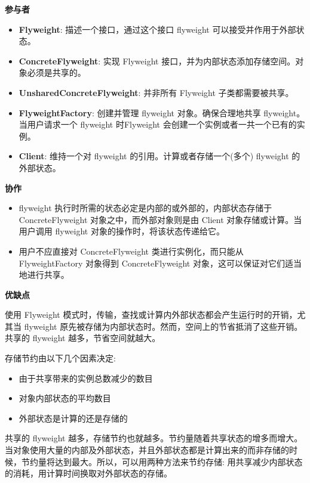 \noindent\textbf{参与者}

\begin{itemize}
    \item \textbf{Flyweight}: 描述一个接口，通过这个接口 flyweight 可以接受并作用于外部状态。
    \item \textbf{ConcreteFlyweight}: 实现 Flyweight 接口，并为内部状态添加存储空间。对象必须是共享的。
    \item \textbf{UnsharedConcreteFlyweight}: 并非所有 Flyweight 子类都需要被共享。
    \item \textbf{FlyweightFactory}: 创建并管理 flyweight 对象。确保合理地共享 flyweight。当用户请求一个 flyweight 时Flyweight 会创建一个实例或者一共一个已有的实例。
    \item \textbf{Client}: 维持一个对 flyweight 的引用。计算或者存储一个(多个) flyweight 的外部状态。
\end{itemize}

\noindent\textbf{协作}

\begin{itemize}
    \item flyweight 执行时所需的状态必定是内部的或外部的，内部状态存储于 ConcreteFlyweight 对象之中，而外部对象则是由 Client 对象存储或计算。当用户调用 flyweight 对象的操作时，将该状态传递给它。
    \item 用户不应直接对 ConcreteFlyweight 类进行实例化，而只能从 FlyweightFactory 对象得到 ConcreteFlyweight 对象，这可以保证对它们适当地进行共享。 
\end{itemize}

\noindent\textbf{优缺点}

使用 Flyweight 模式时，传输，查找或计算内外部状态都会产生运行时的开销，尤其当 flyweight 原先被存储为内部状态时。然而，空间上的节省抵消了这些开销。共享的 flyweight 越多，节省空间就越大。

存储节约由以下几个因素决定:
\begin{itemize}
    \item 由于共享带来的实例总数减少的数目
    \item 对象内部状态的平均数目
    \item 外部状态是计算的还是存储的
\end{itemize}

共享的 flyweight 越多，存储节约也就越多。节约量随着共享状态的增多而增大。当对象使用大量的内部及外部状态，并且外部状态都是计算出来的而非存储的时候，节约量将达到最大。所以，可以用两种方法来节约存储: 用共享减少内部状态的消耗，用计算时间换取对外部状态的存储。

